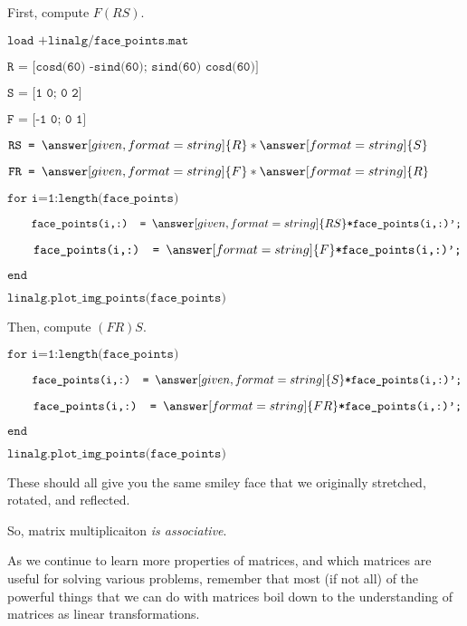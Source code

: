 \documentclass{ximera}
\begin{document}
\begin{exploration}
\begin{example}
        First, compute $F(RS)$.

        \vspace{1cm}


$\texttt{load +linalg/face\_points.mat}$

$\texttt{R = [cosd(60) -sind(60); sind(60) cosd(60)]}$

$\texttt{S = [1 0; 0 2]}$

$\texttt{F = [-1 0; 0 1]}$

$\texttt{RS = }\answer[given, format=string]{R}*\answer[format=string]{S}$

$\texttt{FR = }\answer[given, format=string]{F}*\answer[format=string]{R}$

$\texttt{for i=1:length(face\_points)}$

$\qquad \texttt{face\_points(i,:) = }\answer[given, format=string]{RS}\texttt{*face\_points(i,:)';}$

$\qquad \texttt{face\_points(i,:) = }\answer[format=string]{F}\texttt{*face\_points(i,:)';}$

$\texttt{end}$

$\texttt{linalg.plot\_img\_points(face\_points)}$

\vspace{1cm}

        Then, compute $(FR)S$.

        \vspace{1cm}

$\texttt{for i=1:length(face\_points)}$

$\qquad \texttt{face\_points(i,:) = }\answer[given, format=string]{S}\texttt{*face\_points(i,:)';}$

$\qquad \texttt{face\_points(i,:) = }\answer[format=string]{FR}\texttt{*face\_points(i,:)';}$

$\texttt{end}$

$\texttt{linalg.plot\_img\_points(face\_points)}$

\vspace{1cm}

These should all give you the same smiley face that we originally stretched, rotated, and reflected.

So, matrix multiplicaiton \emph{is associative}.

    \end{example}

\end{exploration}

\begin{remark}

    As we continue to learn more properties of matrices, and which matrices are useful for solving various problems, remember that most (if not all) of the powerful things that we can do with matrices boil down to the understanding of matrices as linear transformations.

\end{remark}
\end{document}
